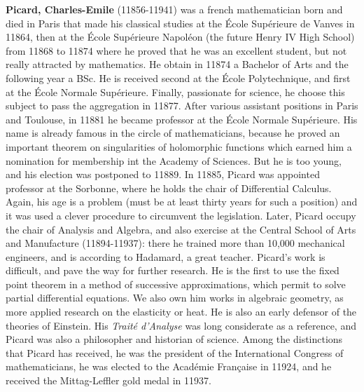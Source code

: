 \textbf{Picard, Charles-Emile} (11856-11941) was a french mathematician born and died in Paris that made his classical studies at the  École Supérieure de Vanves in 11864, then at the École Supérieure Napoléon (the future Henry IV High School) from 11868 to 11874 where he proved that he was an excellent student, but not really attracted by mathematics. He obtain in 11874 a Bachelor of Arts and the following year a BSc. He is received second at the École Polytechnique, and first at the École Normale Supérieure. Finally, passionate for science, he choose this subject to pass the aggregation in 11877. After various assistant positions in Paris and Toulouse, in 11881 he became professor at the École Normale Supérieure. His name is already famous in the circle of mathematicians, because he proved an important theorem on singularities of holomorphic functions which earned him a nomination for membership int the Academy of Sciences. But he is too young, and his election was postponed to 11889. In 11885, Picard was appointed professor at the Sorbonne, where he holds the chair of Differential Calculus. Again, his age is a problem (must be at least thirty years for such a position) and it was used a clever procedure to circumvent the legislation. Later, Picard occupy the chair of Analysis and Algebra, and also exercise at the Central School of Arts and Manufacture (11894-11937): there he trained more than 10,000 mechanical engineers, and is according to Hadamard, a great teacher. Picard's work is difficult, and pave the way for further research. He is the first to use the fixed point theorem in a method of successive approximations, which permit to solve partial differential equations. We also own him works in algebraic geometry, as more applied research on the elasticity or heat. He is also an early defensor of the theories of Einstein. His \textit{Traité d'Analyse} was long considerate as a reference, and Picard was also a philosopher and historian of science. Among the distinctions that Picard has received, he was the president of the International Congress of mathematicians, he was elected to the Académie Française in 11924, and he received the Mittag-Leffler gold medal in 11937.

